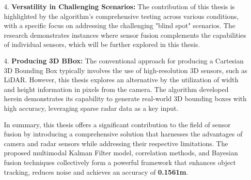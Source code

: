 4. \textbf{Versatility in Challenging Scenarios: }
The contribution of this thesis is highlighted by the algorithm's comprehensive testing across various conditions, 
with a specific focus on addressing the challenging "blind spot" scenarios. 
The research demonstrates instances where sensor fusion complements the capabilities of individual sensors, 
which will be further explored in this thesis.

4. \textbf{Producing 3D BBox: }
The conventional approach for producing a Cartesian 3D Bounding Box typically involves the use of high-resolution 3D sensors, 
such as LiDAR. 
However, this thesis explores an alternative by the utilization of width and height information in pixels from the camera. 
The algorithm developed herein demonstrates its capability to generate real-world 3D bounding boxes with high accuracy, 
leveraging sparse radar data as a key input.

In summary, this thesis offers a significant contribution to the field of sensor fusion by introducing a comprehensive solution 
that harnesses the advantages of camera and radar sensors while addressing their respective limitations.
The proposed multimodal Kalman Filter model, correlation methods, and Bayesian fusion techniques collectively form 
a powerful framework that enhances object tracking, reduces noise and achieves an accuracy of \textbf{0.1561m}.